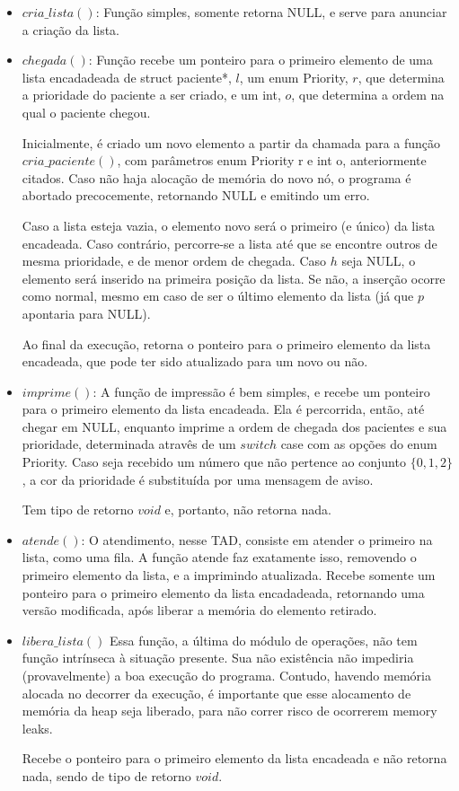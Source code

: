 \documentclass{article}
\begin{document}
\begin{itemize}
\item $cria\_lista()$:
Função simples, somente retorna NULL, e serve para anunciar a criação da lista. 

\item $chegada()$:
Função recebe um ponteiro para o primeiro elemento de uma lista encadadeada de struct paciente*, $l$, um enum Priority, $r$, que determina a prioridade do paciente a ser criado, e um int, $o$, que determina a ordem na qual o paciente chegou. 

Inicialmente, é criado um novo elemento a partir da chamada para a função $cria\_paciente()$, com parâmetros enum Priority r e int o, anteriormente citados. Caso não haja alocação de memória do novo nó, o programa é abortado precocemente, retornando NULL e emitindo um erro. 

Caso a lista esteja vazia, o elemento novo será o primeiro (e único) da lista encadeada. Caso contrário, percorre-se a lista até que se encontre outros de mesma prioridade, e de menor ordem de chegada. Caso $h$ seja NULL, o elemento será inserido na primeira posição da lista. Se não, a inserção ocorre como normal, mesmo em caso de ser o último elemento da lista (já que $p$ apontaria para NULL). 

Ao final da execução, retorna o ponteiro para o primeiro elemento da lista encadeada, que pode ter sido atualizado para um novo ou não.

\item $imprime()$: 
A função de impressão é bem simples, e recebe um ponteiro para o primeiro elemento da lista encadeada. Ela é percorrida, então, até chegar em NULL, enquanto imprime a ordem de chegada dos pacientes e sua prioridade, determinada atravês de um $switch$ case com as opções do enum Priority. Caso seja recebido um número que não pertence ao conjunto $\{0, 1, 2\}$, a cor da prioridade é substituída por uma mensagem de aviso. 

Tem tipo de retorno $void$ e, portanto, não retorna nada. 

\item $atende()$:
O atendimento, nesse TAD, consiste em atender o primeiro na lista, como uma fila. A função atende faz exatamente isso, removendo o primeiro elemento da lista, e a imprimindo atualizada. Recebe somente um ponteiro para o primeiro elemento da lista encadadeada, retornando uma versão modificada, após liberar a memória do elemento retirado. 

\item $libera\_lista()$
Essa função, a última do módulo de operações, não tem função intrínseca à situação presente. Sua não existência não impediria (provavelmente) a boa execução do programa. Contudo, havendo memória alocada no decorrer da execução, é importante que esse alocamento de memória da heap seja liberado, para não correr risco de ocorrerem memory leaks. 

Recebe o ponteiro para o primeiro elemento da lista encadeada e não retorna nada, sendo de tipo de retorno $void$.

\end{itemize}
\end{document}
